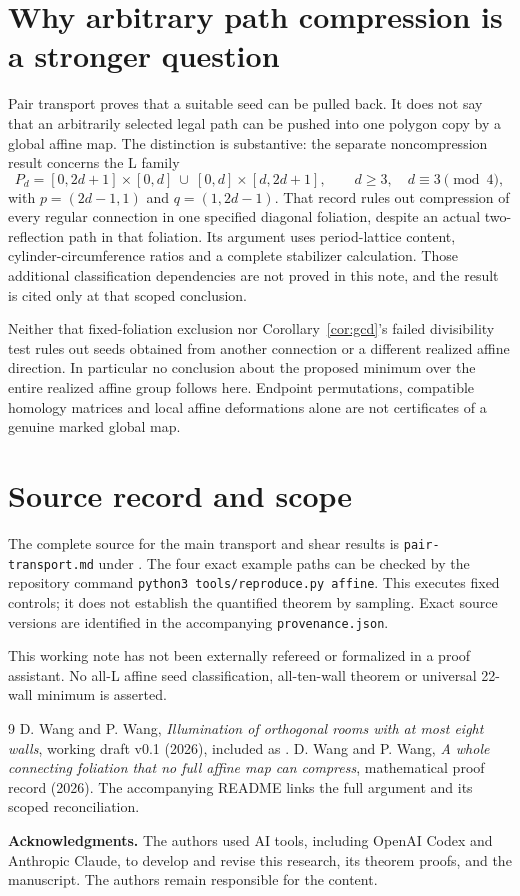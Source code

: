 \documentclass[11pt]{article}
\theoremstyle{definition}
\begin{document}
\section{Why arbitrary path compression is a stronger question}
Pair transport proves that a suitable seed can be pulled back. It does not say that an arbitrarily selected legal path can be pushed into one polygon copy by a global affine map. The distinction is substantive: the separate noncompression result \cite{noncompression} concerns the L family
\[
 P_d=[0,2d+1]\times[0,d]\ \cup\ [0,d]\times[d,2d+1],
 \qquad d\ge3,\quad d\equiv3\pmod4,
\]
with $p=(2d-1,1)$ and $q=(1,2d-1)$. That record rules out compression of every regular connection in one specified diagonal foliation, despite an actual two-reflection path in that foliation. Its argument uses period-lattice content, cylinder-circumference ratios and a complete stabilizer calculation. Those additional classification dependencies are not proved in this note, and the result is cited only at that scoped conclusion.

Neither that fixed-foliation exclusion nor Corollary~\ref{cor:gcd}'s failed divisibility test rules out seeds obtained from another connection or a different realized affine direction. In particular no conclusion about the proposed minimum over the entire realized affine group follows here. Endpoint permutations, compatible homology matrices and local affine deformations alone are not certificates of a genuine marked global map.

\section{Source record and scope}
The complete source for the main transport and shear results is \texttt{pair-transport.md} under . The four exact example paths can be checked by the repository command \texttt{python3 tools/reproduce.py affine}. This executes fixed controls; it does not establish the quantified theorem by sampling. Exact source versions are identified in the accompanying \texttt{provenance.json}.

This working note has not been externally refereed or formalized in a proof assistant. No all-L affine seed classification, all-ten-wall theorem or universal 22-wall minimum is asserted.

\begin{thebibliography}{9}
 D. Wang and P. Wang, \emph{Illumination of orthogonal rooms with at most eight walls}, working draft v0.1 (2026), included as .
 D. Wang and P. Wang, \emph{A whole connecting foliation that no full affine map can compress}, mathematical proof record (2026). The accompanying README links the full argument and its scoped reconciliation.
\end{thebibliography}

\smallskip\noindent\textbf{Acknowledgments.} The authors used AI tools, including OpenAI Codex and Anthropic Claude, to develop and revise this research, its theorem proofs, and the manuscript. The authors remain responsible for the content.
\end{document}
